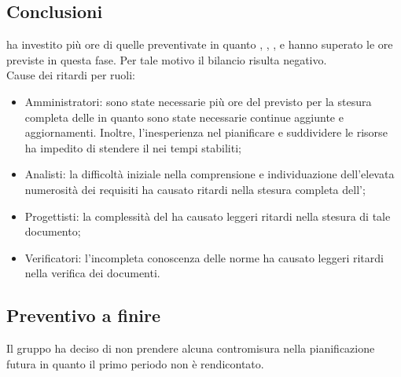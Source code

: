     \subsection{Conclusioni}
   \groupName ha investito più ore di quelle preventivate in quanto \roleAdministrator{}, \roleAnalyst{}, \roleDesigner{}, \roleProgrammer{} e \roleVerifier{} hanno superato le ore previste in questa fase.
   Per tale motivo il bilancio risulta negativo. \\
   Cause dei ritardi per ruoli:
        \begin{itemize}
            \item Amministratori: sono state necessarie più ore del previsto per la stesura completa delle \doc{\docNameNdP{}} in quanto sono state necessarie continue aggiunte e aggiornamenti. Inoltre, l'inesperienza nel pianificare e suddividere le risorse ha impedito di stendere il \doc{\docNamePdP{}} nei tempi stabiliti;
            \item Analisti: la difficoltà iniziale nella comprensione e individuazione dell'elevata numerosità dei requisiti ha causato ritardi nella stesura completa dell'\doc{\docNameAdR{}};
            \item Progettisti: la complessità del \doc{\docNamePdQ{}} ha causato leggeri ritardi nella stesura di tale documento; 
            \item Verificatori: l'incompleta conoscenza delle norme ha causato leggeri ritardi nella verifica dei documenti.
        \end{itemize}

   \subsection{Preventivo a finire}
   Il gruppo ha deciso di non prendere alcuna contromisura nella pianificazione futura in quanto il primo periodo non è rendicontato.